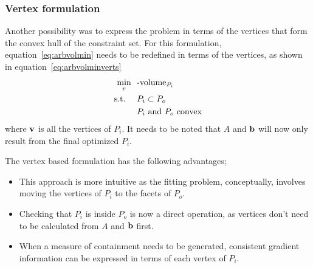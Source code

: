 \subsubsection{Vertex formulation}
Another possibility was to express the problem in terms of the vertices that form the convex hull of the constraint set.
For this formulation, equation~\ref{eq:arbvolmin} needs to be redefined in terms of the vertices, as shown in equation~\ref{eq:arbvolminverts}
\begin{align}
  \label{eq:arbvolminverts}
    \min_{v}~~&\text{-volume}_{P_i}\\
    \text{s.t.}~~~~ &P_i \subset P_o \notag \\
                    &P_i \text{~and~} P_o \text{~convex} \notag
\end{align}
where ${\bf {v}}$ is all the vertices of $P_i$.
It needs to be noted that $A$ and ${\bf {b}}$ will now only result from the final optimized $P_i$.

The vertex based formulation has the following advantages;
\begin{itemize}
  \item This approach is more intuitive as the fitting problem, conceptually, involves moving the vertices of $P_i$ to the facets of $P_o$.
  \item Checking that $P_i$ is inside $P_o$ is now a direct operation, as vertices don't need to be calculated from $A$ and ${\bf {b}}$ first.
  \item When a measure of containment needs to be generated, consistent gradient information can be expressed in terms of each vertex of $P_i$.
\end{itemize}

